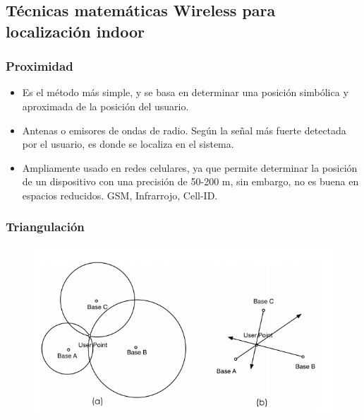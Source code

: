 \documentclass[mathserif]{beamer}
\begin{document}
\subsection{Técnicas  matemáticas Wireless para localización indoor}
\begin{frame}
\frametitle{Proximidad}

\begin{itemize}

\item Es el método más simple, y se basa en determinar una posición simbólica y aproximada de la posición del usuario.

\item Antenas o emisores de ondas de radio. Según la señal más fuerte detectada por el usuario, es donde se localiza en el sistema.

\item Ampliamente usado en redes celulares, ya que permite determinar la posición de un dispositivo con una precisión de 50-200 m, sin embargo, no es buena en espacios reducidos. GSM, Infrarrojo, Cell-ID.
\end{itemize}


\end{frame}


\begin{frame}
\frametitle{Triangulación}

\begin{figure}
\includegraphics[width=\linewidth]{../figures/triangulacion.png}
\end{figure}

\end{frame}

\end{document}
